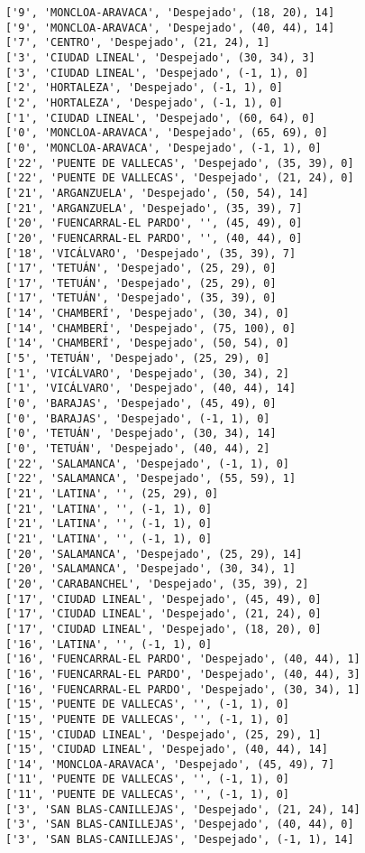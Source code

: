 \documentclass[11pt]{article}
\begin{document}
\begin{Verbatim}[commandchars=\\\{\}]
['9', 'MONCLOA-ARAVACA', 'Despejado', (18, 20), 14]
['9', 'MONCLOA-ARAVACA', 'Despejado', (40, 44), 14]
['7', 'CENTRO', 'Despejado', (21, 24), 1]
['3', 'CIUDAD LINEAL', 'Despejado', (30, 34), 3]
['3', 'CIUDAD LINEAL', 'Despejado', (-1, 1), 0]
['2', 'HORTALEZA', 'Despejado', (-1, 1), 0]
['2', 'HORTALEZA', 'Despejado', (-1, 1), 0]
['1', 'CIUDAD LINEAL', 'Despejado', (60, 64), 0]
['0', 'MONCLOA-ARAVACA', 'Despejado', (65, 69), 0]
['0', 'MONCLOA-ARAVACA', 'Despejado', (-1, 1), 0]
['22', 'PUENTE DE VALLECAS', 'Despejado', (35, 39), 0]
['22', 'PUENTE DE VALLECAS', 'Despejado', (21, 24), 0]
['21', 'ARGANZUELA', 'Despejado', (50, 54), 14]
['21', 'ARGANZUELA', 'Despejado', (35, 39), 7]
['20', 'FUENCARRAL-EL PARDO', '', (45, 49), 0]
['20', 'FUENCARRAL-EL PARDO', '', (40, 44), 0]
['18', 'VICÁLVARO', 'Despejado', (35, 39), 7]
['17', 'TETUÁN', 'Despejado', (25, 29), 0]
['17', 'TETUÁN', 'Despejado', (25, 29), 0]
['17', 'TETUÁN', 'Despejado', (35, 39), 0]
['14', 'CHAMBERÍ', 'Despejado', (30, 34), 0]
['14', 'CHAMBERÍ', 'Despejado', (75, 100), 0]
['14', 'CHAMBERÍ', 'Despejado', (50, 54), 0]
['5', 'TETUÁN', 'Despejado', (25, 29), 0]
['1', 'VICÁLVARO', 'Despejado', (30, 34), 2]
['1', 'VICÁLVARO', 'Despejado', (40, 44), 14]
['0', 'BARAJAS', 'Despejado', (45, 49), 0]
['0', 'BARAJAS', 'Despejado', (-1, 1), 0]
['0', 'TETUÁN', 'Despejado', (30, 34), 14]
['0', 'TETUÁN', 'Despejado', (40, 44), 2]
['22', 'SALAMANCA', 'Despejado', (-1, 1), 0]
['22', 'SALAMANCA', 'Despejado', (55, 59), 1]
['21', 'LATINA', '', (25, 29), 0]
['21', 'LATINA', '', (-1, 1), 0]
['21', 'LATINA', '', (-1, 1), 0]
['21', 'LATINA', '', (-1, 1), 0]
['20', 'SALAMANCA', 'Despejado', (25, 29), 14]
['20', 'SALAMANCA', 'Despejado', (30, 34), 1]
['20', 'CARABANCHEL', 'Despejado', (35, 39), 2]
['17', 'CIUDAD LINEAL', 'Despejado', (45, 49), 0]
['17', 'CIUDAD LINEAL', 'Despejado', (21, 24), 0]
['17', 'CIUDAD LINEAL', 'Despejado', (18, 20), 0]
['16', 'LATINA', '', (-1, 1), 0]
['16', 'FUENCARRAL-EL PARDO', 'Despejado', (40, 44), 1]
['16', 'FUENCARRAL-EL PARDO', 'Despejado', (40, 44), 3]
['16', 'FUENCARRAL-EL PARDO', 'Despejado', (30, 34), 1]
['15', 'PUENTE DE VALLECAS', '', (-1, 1), 0]
['15', 'PUENTE DE VALLECAS', '', (-1, 1), 0]
['15', 'CIUDAD LINEAL', 'Despejado', (25, 29), 1]
['15', 'CIUDAD LINEAL', 'Despejado', (40, 44), 14]
['14', 'MONCLOA-ARAVACA', 'Despejado', (45, 49), 7]
['11', 'PUENTE DE VALLECAS', '', (-1, 1), 0]
['11', 'PUENTE DE VALLECAS', '', (-1, 1), 0]
['3', 'SAN BLAS-CANILLEJAS', 'Despejado', (21, 24), 14]
['3', 'SAN BLAS-CANILLEJAS', 'Despejado', (40, 44), 0]
['3', 'SAN BLAS-CANILLEJAS', 'Despejado', (-1, 1), 14]

\end{Verbatim}
\end{document}
